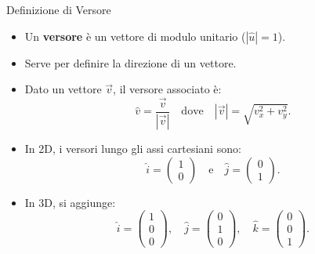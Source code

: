\documentclass{beamer}
\begin{document}
\begin{frame}{Definizione di Versore}
    \begin{itemize}
        \item Un \textbf{versore} è un vettore di modulo unitario ($|\hat{u}| = 1$).
        \item Serve per definire la direzione di un vettore.
        \item Dato un vettore $\vec{v}$, il versore associato è:
        \[
        \hat{v} = \frac{\vec{v}}{|\vec{v}|} \quad \text{dove} \quad
        |\vec{v}| = \sqrt{v_x^2 + v_y^2}.
        \]
        \item In 2D, i versori lungo gli assi cartesiani sono:
        \[
        \hat{i} =
        \begin{pmatrix}
            1 \\
            0
        \end{pmatrix}
        \quad \text{e} \quad
        \hat{j} =
        \begin{pmatrix}
            0 \\
            1
        \end{pmatrix}.
        \]
        \item In 3D, si aggiunge:
        \[
        \hat{i} =
        \begin{pmatrix}
            1 \\
            0 \\
            0
        \end{pmatrix}, \quad
        \hat{j} =
        \begin{pmatrix}
            0 \\
            1 \\
            0
        \end{pmatrix}, \quad
        \hat{k} =
        \begin{pmatrix}
            0 \\
            0 \\
            1
        \end{pmatrix}.
        \]
    \end{itemize}
\end{frame}
\end{document}
